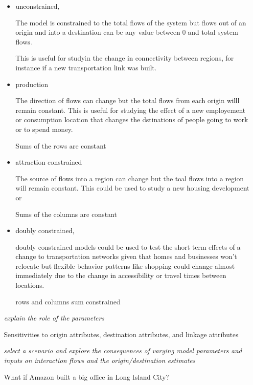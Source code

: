 \documentclass[11pt]{article} %
\begin{document}
 \begin{itemize}
\item unconstrained, 

The model is constrained to the total flows of the system but flows out of an origin and into a destination can be any value between 0 and total system flows. 

This is useful for studyin the change in connectivity between regions, for instance if a new transportation link was built. 

\item production 

The direction of flows can change but the total flows from each origin willl remain constant. This is useful for studying the effect of a new employement or consumption location that changes the dstinations of people going to work or to spend money. 

Sums of the rows are constant

\item attraction constrained

The source of flows into a region can change but the toal flows into a region will remain constant. This could be used to study a new housing development or 

Sums of the columns are constant

\item doubly constrained,

doubly constrained models could be used to test the short term effects of a change to transportation networks given that homes and businesses won't relocate but flexible behavior patterns like shopping could change almost immediately due to the change in accessibility or travel times between locations. 

rows and columns sum constrained

\end{itemize}

\textit{explain the role of the parameters}

Sensitivities to origin attributes, destination attributes, and linkage attributes

\textit{select a scenario and explore the consequences of varying model parameters and inputs on interaction flows and the origin/destination estimates}


What if Amazon built a big office in Long Island City? 



\end{document}
